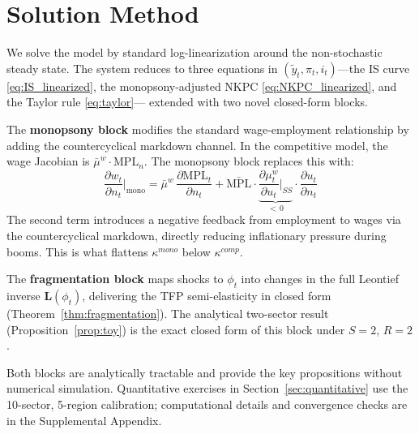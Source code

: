 \section{Solution Method}
\label{sec:solution}

We solve the model by standard log-linearization around the non-stochastic
steady state. The system reduces to three equations in $(\tilde y_t, \pi_t,
i_t)$---the IS curve \eqref{eq:IS_linearized}, the monopsony-adjusted NKPC
\eqref{eq:NKPC_linearized}, and the Taylor rule \eqref{eq:taylor}---
extended with two novel closed-form blocks.

The \textbf{monopsony block} modifies the standard wage-employment
relationship by adding the countercyclical markdown channel. In the
competitive model, the wage Jacobian is $\bar\mu^w \cdot \mathrm{MPL}_n$.
The monopsony block replaces this with:
\begin{equation}
  \frac{\partial w_t}{\partial n_t}\Bigg|_{\text{mono}} =
  \bar\mu^w\,\frac{\partial\mathrm{MPL}_t}{\partial n_t}
  + \bar{\mathrm{MPL}}\cdot
  \underbrace{\frac{\partial\mu^w_t}{\partial u_t}\bigg|_{SS}}_{<\,0}
  \cdot\frac{\partial u_t}{\partial n_t}
  \label{eq:mono_jacobian}
\end{equation}
The second term introduces a negative feedback from employment to wages via
the countercyclical markdown, directly reducing inflationary pressure during
booms. This is what flattens $\kappa^{mono}$ below $\kappa^{comp}$.

The \textbf{fragmentation block} maps shocks to $\phi_t$ into changes in
the full Leontief inverse $\mathbf{L}(\phi_t)$, delivering the TFP
semi-elasticity in closed form (Theorem~\ref{thm:fragmentation}). The
analytical two-sector result (Proposition~\ref{prop:toy}) is the exact
closed form of this block under $S=2$, $R=2$.

Both blocks are analytically tractable and provide the key propositions
without numerical simulation. Quantitative exercises in
Section~\ref{sec:quantitative} use the 10-sector, 5-region calibration;
computational details and convergence checks are in the Supplemental
Appendix.
